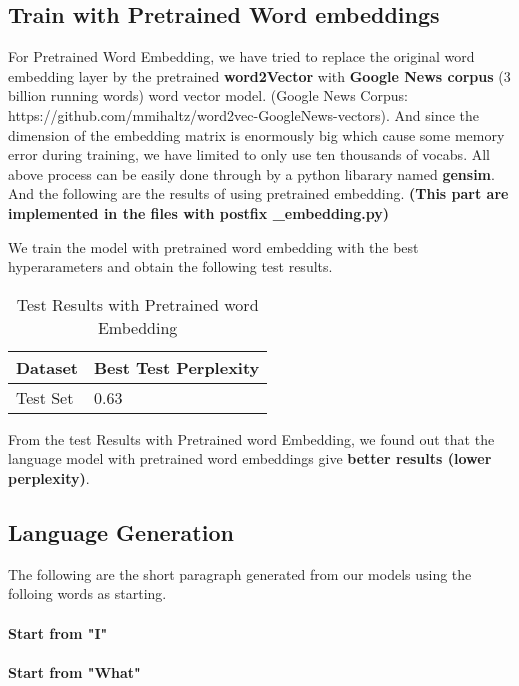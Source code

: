 \documentclass{article}
\begin{document}
\subsection{Train with Pretrained Word embeddings}
For Pretrained Word Embedding, we have tried to replace the original word embedding layer by the pretrained \textbf{word2Vector} with \textbf{Google News corpus} (3 billion running words) word vector model. (Google News Corpus: https://github.com/mmihaltz/word2vec-GoogleNews-vectors). And since the dimension of the embedding matrix is enormously big which cause some memory error during training, we have limited to only use ten thousands of vocabs. All above process can be easily done through by a python libarary named \textbf{gensim}. And the following are the results of using pretrained embedding. \textbf{(This part are implemented in the files with postfix \_embedding.py)}

We train the model with pretrained word embedding with the best hyperarameters and obtain the following test results.

\begin{table}[htb]
	\caption{Test Results with Pretrained word Embedding}
	\label{sample-table}
	\centering
	\begin{tabular}{ll}
		\toprule
		\cmidrule{1-2}
		Dataset & Best Test Perplexity\\
		\midrule
		Test Set & 0.63   \\
		\bottomrule
	\end{tabular}
\end{table}

From the test Results with Pretrained word Embedding, we found out that the language model with pretrained word embeddings give \textbf{better results (lower perplexity)}.

\subsection{Language Generation}
The following are the short paragraph generated from our models using the folloing words as starting.

\paragraph{Start from "I"}

\paragraph{Start from "What"}
\end{document}
